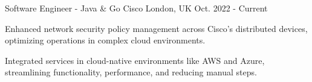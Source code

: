 

\begin{cventries}


\cventry
    {Software Engineer - Java \& Go} %
    {Cisco} %
    {London, UK} %
    {Oct. 2022 - Current} %
    {
      \begin{cvitems}
        \item {Enhanced network security policy management across Cisco's distributed devices, optimizing operations in complex cloud environments.}
        \item {Integrated services in cloud-native environments like AWS and Azure, streamlining functionality, performance, and reducing manual steps.}

\end{cvitems}}
\end{cventries}

